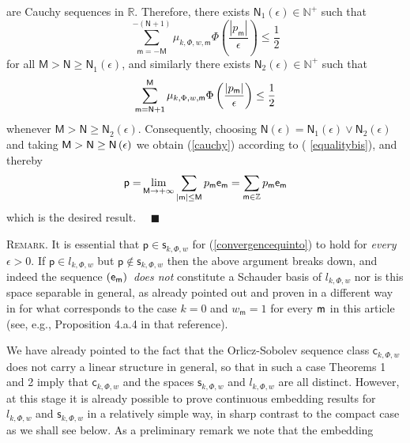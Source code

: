 \documentclass{article}
\begin{document}
are Cauchy sequences in $\mathbb{R}$. Therefore, there exists $\mathsf{N}%
_{1}\left( \epsilon \right) \in \mathbb{N}^{+}$ such that%
\begin{equation*}
\sum_{\mathsf{m=-M}}^{\mathsf{-}\left( \mathsf{N}+1\right) }\mu _{k,\Phi ,w,%
\mathsf{m}}\Phi \left( \frac{\left\vert p_{\mathsf{m}}\right\vert }{\epsilon 
}\right) \leq \frac{1}{2}
\end{equation*}%
for all $\mathsf{M>N\geq N}_{1}\left( \epsilon \right) $, and similarly
there exists $\mathsf{N}_{2}\left( \epsilon \right) \in \mathbb{N}^{+}$ such
that%
\begin{equation*}
\sum_{\mathsf{m=N+1}}^{\mathsf{M}}\mu _{k,\Phi ,w,\mathsf{m}}\Phi \left( 
\frac{\left\vert p_{\mathsf{m}}\right\vert }{\epsilon }\right) \leq \frac{1}{%
2}
\end{equation*}%
whenever $\mathsf{M>N\geq N}_{2}\left( \epsilon \right) $. Consequently,
choosing $\mathsf{N}\left( \epsilon \right) =\mathsf{N}_{1}\left( \epsilon
\right) \vee \mathsf{N}_{2}\left( \epsilon \right) $ and taking $\mathsf{%
M>N\geq N}\left( \epsilon \right) $ we obtain (\ref{cauchy}) according to (%
\ref{equalitybis}), and thereby%
\begin{equation*}
\mathsf{p=}\lim_{\mathsf{M\rightarrow +\infty }}\sum_{\left\vert \mathsf{m}%
\right\vert \leq \mathsf{M}}p_{\mathsf{m}}\mathsf{e}_{\mathsf{m}}=\sum_{%
\mathsf{m}\in \mathbb{Z}}p_{\mathsf{m}}\mathsf{e}_{\mathsf{m}}
\end{equation*}%
which is the desired result. \ \ $\blacksquare $

\bigskip

\textsc{Remark.} It is essential that $\mathsf{p}\in \mathsf{s}_{k,\Phi ,w}$
for (\ref{convergencequinto}) to hold for \textit{every} $\epsilon >0$. If $%
\mathsf{p}\in l_{k,\Phi ,w}$ but $\mathsf{p}\notin \mathsf{s}_{k,\Phi ,w}$
then the above argument breaks down, and indeed the sequence $\left( \mathsf{%
e}_{\mathsf{m}}\right) \mathsf{\ }$\textit{does not} constitute a Schauder
basis of $l_{k,\Phi ,w}$ nor is this space separable in general, as already
pointed out and proven in a different way in \cite{lindenstrausstra} for
what corresponds to the case $k=0$ and $w_{\mathsf{m}}=1$ for every $\mathsf{%
m}$ in this article (see, e.g., Proposition 4.a.4 in that reference).

\bigskip

We have already pointed to the fact that the Orlicz-Sobolev sequence class $%
\mathsf{c}_{k,\Phi ,w}$ does not carry a linear structure in general, so
that in such a case Theorems 1 and 2 imply that $\mathsf{c}_{k,\Phi ,w}$ and
the spaces $\mathsf{s}_{k,\Phi ,w}$ and $l_{k,\Phi ,w}$ are all distinct.
However, at this stage it is already possible to prove continuous embedding
results for $l_{k,\Phi ,w}$ and $\mathsf{s}_{k,\Phi ,w}$ in a relatively
simple way, in sharp contrast to the compact case as we shall see below. As
a preliminary remark we note that the embedding
\end{document}
